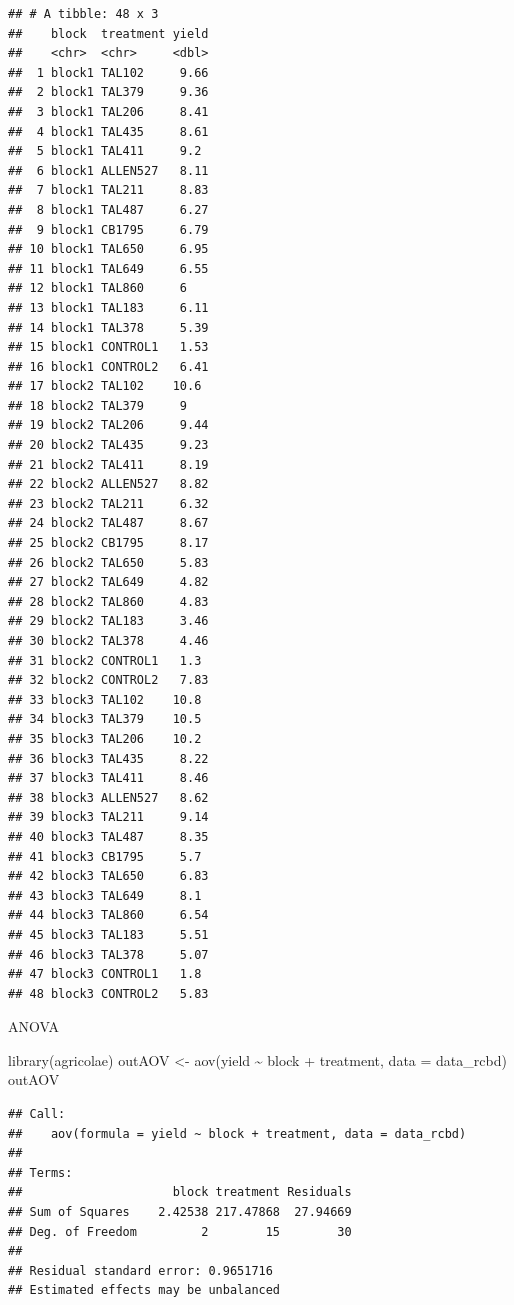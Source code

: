 \documentclass[
]{book}
\newenvironment{Shaded}{\begin{snugshade}}{\end{snugshade}}
\newcommand{\AttributeTok}[1]{\textcolor[rgb]{0.77,0.63,0.00}{#1}}
\newcommand{\FunctionTok}[1]{\textcolor[rgb]{0.00,0.00,0.00}{#1}}
\newcommand{\NormalTok}[1]{#1}
\newcommand{\OtherTok}[1]{\textcolor[rgb]{0.56,0.35,0.01}{#1}}
\newcommand{\SpecialCharTok}[1]{\textcolor[rgb]{0.00,0.00,0.00}{#1}}
\theoremstyle{definition}
\theoremstyle{definition}
\theoremstyle{definition}
\theoremstyle{definition}
\theoremstyle{remark}
\begin{document}
\begin{verbatim}
## # A tibble: 48 x 3
##    block  treatment yield
##    <chr>  <chr>     <dbl>
##  1 block1 TAL102     9.66
##  2 block1 TAL379     9.36
##  3 block1 TAL206     8.41
##  4 block1 TAL435     8.61
##  5 block1 TAL411     9.2 
##  6 block1 ALLEN527   8.11
##  7 block1 TAL211     8.83
##  8 block1 TAL487     6.27
##  9 block1 CB1795     6.79
## 10 block1 TAL650     6.95
## 11 block1 TAL649     6.55
## 12 block1 TAL860     6   
## 13 block1 TAL183     6.11
## 14 block1 TAL378     5.39
## 15 block1 CONTROL1   1.53
## 16 block1 CONTROL2   6.41
## 17 block2 TAL102    10.6 
## 18 block2 TAL379     9   
## 19 block2 TAL206     9.44
## 20 block2 TAL435     9.23
## 21 block2 TAL411     8.19
## 22 block2 ALLEN527   8.82
## 23 block2 TAL211     6.32
## 24 block2 TAL487     8.67
## 25 block2 CB1795     8.17
## 26 block2 TAL650     5.83
## 27 block2 TAL649     4.82
## 28 block2 TAL860     4.83
## 29 block2 TAL183     3.46
## 30 block2 TAL378     4.46
## 31 block2 CONTROL1   1.3 
## 32 block2 CONTROL2   7.83
## 33 block3 TAL102    10.8 
## 34 block3 TAL379    10.5 
## 35 block3 TAL206    10.2 
## 36 block3 TAL435     8.22
## 37 block3 TAL411     8.46
## 38 block3 ALLEN527   8.62
## 39 block3 TAL211     9.14
## 40 block3 TAL487     8.35
## 41 block3 CB1795     5.7 
## 42 block3 TAL650     6.83
## 43 block3 TAL649     8.1 
## 44 block3 TAL860     6.54
## 45 block3 TAL183     5.51
## 46 block3 TAL378     5.07
## 47 block3 CONTROL1   1.8 
## 48 block3 CONTROL2   5.83
\end{verbatim}

ANOVA

\begin{Shaded}
\begin{Highlighting}[]
\FunctionTok{library}\NormalTok{(agricolae)}
\NormalTok{outAOV }\OtherTok{\textless{}{-}} \FunctionTok{aov}\NormalTok{(yield }\SpecialCharTok{\textasciitilde{}}\NormalTok{ block }\SpecialCharTok{+}\NormalTok{ treatment, }\AttributeTok{data =}\NormalTok{ data\_rcbd)}
\NormalTok{outAOV}
\end{Highlighting}
\end{Shaded}

\begin{verbatim}
## Call:
##    aov(formula = yield ~ block + treatment, data = data_rcbd)
## 
## Terms:
##                     block treatment Residuals
## Sum of Squares    2.42538 217.47868  27.94669
## Deg. of Freedom         2        15        30
## 
## Residual standard error: 0.9651716
## Estimated effects may be unbalanced
\end{verbatim}
\end{document}
